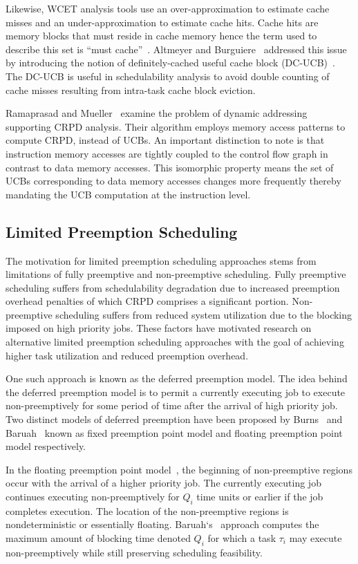 Likewise, WCET analysis tools use an over-approximation to estimate cache misses and an under-approximation to estimate cache hits.  Cache hits are memory blocks that must reside in cache memory hence the term used to describe this set is “must cache”~\cite{altmeyer:11c}.  Altmeyer and Burguiere~\cite{altmeyer:11c} addressed this issue by introducing the notion of definitely-cached useful cache block (DC-UCB)~\cite{altmeyer:11c}.  The DC-UCB is useful in schedulability analysis to avoid double counting of cache misses resulting from intra-task cache block eviction.

Ramaprasad and Mueller~\cite{ramaprasad:06} examine the problem of dynamic addressing supporting CRPD analysis. Their algorithm employs memory access patterns to compute CRPD, instead of UCBs.  An important distinction to note is that instruction memory accesses are tightly coupled to the control flow graph in contrast to data memory accesses. This isomorphic property means the set of UCBs corresponding to data memory accesses changes more frequently thereby mandating the UCB computation at the instruction level.
\subsection {Limited Preemption Scheduling}\label{sec:lp_related_work}
The motivation for limited preemption scheduling approaches stems from limitations of fully preemptive and non-preemptive scheduling.  Fully preemptive scheduling suffers from schedulability degradation due to increased preemption overhead penalties of which CRPD comprises a significant portion.  Non-preemptive scheduling suffers from reduced system utilization due to the blocking imposed on high priority jobs.  These factors have motivated research on alternative limited preemption scheduling approaches with the goal of achieving higher task utilization and reduced preemption overhead.

One such approach is known as the deferred preemption model.  The idea behind the deferred preemption model is to permit a currently executing job to execute non-preemptively for some period of time after the arrival of high priority job.  Two distinct models of deferred preemption have been proposed by Burns~\cite{burns:05} and Baruah~\cite{baruah:05} known as fixed preemption point model and floating preemption point model respectively.

In the floating preemption point model~\cite{baruah:05}, the beginning of non-preemptive regions occur with the arrival of a higher priority job.  The currently executing job continues executing non-preemptively for \begin{math}Q_{i}\end{math} time units or earlier if the job completes execution. The location of the non-preemptive regions is nondeterministic or essentially floating. Baruah`s~\cite{baruah:05} approach computes the maximum amount of blocking time denoted \begin{math}Q_{i}\end{math} for which a task \begin{math}\tau_{i}\end{math} may execute non-preemptively while still preserving scheduling feasibility.

